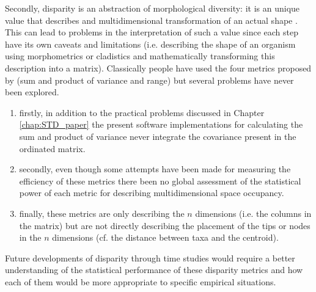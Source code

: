 Secondly, disparity is an abstraction of morphological diversity: it is an unique value that describes and multidimensional transformation of an actual shape \citep{Wills1994,foote1997evolution}. %
This can lead to problems in the interpretation of such a value since each step have its own caveats and limitations (i.e. describing the shape of an organism using morphometrics or cladistics and mathematically transforming this description into a matrix).
Classically people have used the four metrics proposed by \cite{Wills1994} (sum and product of variance and range) but several problems have never been explored.
\begin{enumerate}
\item firstly, in addition to the practical problems discussed in Chapter \ref{chap:STD_paper} the present software implementations for calculating the sum and product of variance never integrate the covariance present in the ordinated matrix.
\item secondly, even though some attempts have been made for measuring the efficiency of these metrics \citep{Ciampaglio2001} there been no global assessment of the statistical power of each metric for describing multidimensional space occupancy.
\item finally, these metrics are only describing the $n$ dimensions (i.e. the columns in the matrix) but are not directly describing the placement of the tips or nodes in the $n$ dimensions (cf. the distance between taxa and the centroid). %
\end{enumerate}
Future developments of disparity through time studies would require a better understanding of the statistical performance of these disparity metrics and how each of them would be more appropriate to specific empirical situations. %

